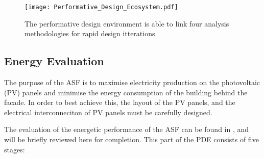 \begin{figure}
\begin{center}
\texttt{[image: Performative\_Design\_Ecosystem.pdf]}
\caption{The performative design environment is able to link four analysis methodologies for rapid design itterations}
\label{fig:performative}
\end{center}
\end{figure}

\subsection{Energy Evaluation}
\label{ch:energy}

The purpose of the ASF is to maximise electricity production on the photovoltaic (PV) panels and minimise the energy consumption of the building behind the facade. In order to best achieve this, the layout of the PV panels, and the electrical interconneciton of PV panels must be carefully designed.

The evaluation of the energetic performance of the ASF can be found in \cite{jayathissa2017optimising}, and will be briefly reviewed here for completion. This part of the PDE consists of five stages: 

